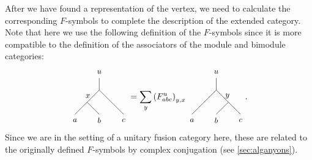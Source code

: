{After we have found a representation of the vertex, we need to calculate the corresponding $F$-symbols to complete the description of the extended category. Note that here we use the following definition of the $F$-symbols since it is more compatible to the definition of the associators of the module and bimodule categories:
	\begin{equation}
	\label{eq:FsymGD}
		\begin{tikzpicture}[baseline={([yshift=-3pt]current bounding box.center)}]
			\draw (0,0) -- (0,0.5);
			\draw (0,0) to node[left] {\small $x$} (-0.5,-0.5);
			\draw (-0.5,-0.5) -- (-1,-1);
			\draw (-0.5,-0.5) -- (0,-1);
			\draw (0,0) -- (1,-1);
			\node at (0,0.75) {\small $u$};
			\node at (-1,-1.25) {\small $a$};
			\node at (0,-1.25) {\small $b$};
			\node at (1,-1.25) {\small $c$};
		\end{tikzpicture}
		=\sum_{y}\left(F_{abc}^u\right)_{y,x} 
		\begin{tikzpicture}[baseline={([yshift=-3pt]current bounding box.center)}]
			\draw (0,0) -- (0,0.5);
			\draw (0,0) to node[right] {\small $y$} (0.5,-0.5);
			\draw (0.5,-0.5) -- (1,-1);
			\draw (0.5,-0.5) -- (0,-1);
			\draw (0,0) -- (-1,-1);
			\node at (0,0.75) {\small $u$};
			\node at (-1,-1.25) {\small $a$};
			\node at (0,-1.25) {\small $b$};
			\node at (1,-1.25) {\small $c$};
		\end{tikzpicture}.
	\end{equation}
Since we are in the setting of a unitary fusion category here, these are related to the originally defined $F$-symbols by complex conjugation (see \cref{sec:alganyons}).

}
